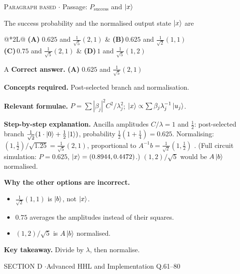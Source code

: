 \documentclass[11pt,a4paper]{article}
\newcommand{\optlabel}[1]{\textbf{(#1)}}
\newcommand{\correctlabel}[1]{\textcolor{okgreen}{\textbf{(#1)}\,\ding{51}}}
\newenvironment{qitem}[1]{\begin{list}{}{\setlength{\leftmargin}{3.3em}\setlength{\labelwidth}{3.1em}%
  \setlength{\labelsep}{0.2em}\setlength{\topsep}{3pt}\setlength{\parsep}{3pt}}\item[\textbf{Q.#1}\hfill]}{\end{list}}
\newcommand{\qsep}{\par\vspace{2pt}{\color{black!15}\hrule}\vspace{4pt}}
\newcommand{\qmeta}[2]{{\footnotesize\color{black!60}\textsc{#1} \;$\cdot$\; #2}\par}
\begin{document}
\begin{qitem}{60}
\qmeta{Paragraph based}{Passage: $P_{\text{success}}$ and $\ket x$}
The success probability and the normalised output state $\ket x$ are
\par\smallskip\noindent\begin{tabularx}{\linewidth}{@{}*{2}{L}@{}}
\correctlabel{A}\,$0.625$ and $\tfrac{1}{\sqrt5}(2, 1)$ & \optlabel{B}\,$0.625$ and $\tfrac{1}{\sqrt2}(1, 1)$ \\[3pt]
\optlabel{C}\,$0.75$ and $\tfrac{1}{\sqrt5}(2, 1)$ & \optlabel{D}\,$1$ and $\tfrac{1}{\sqrt5}(1, 2)$
\end{tabularx}
\end{qitem}
\begin{solbox}{A}
\textbf{\color{brand}Correct answer.} \textcolor{okgreen}{\textbf{(A)}} $0.625$ and $\tfrac{1}{\sqrt5}(2, 1)$

\textbf{\color{brand}Concepts required.} Post-selected branch and normalisation.

\textbf{\color{brand}Relevant formulae.} $P = \sum|\beta_j|^2C^2/\lambda_j^2$; $\ket x \propto \sum\beta_j\lambda_j^{-1}\ket{u_j}$.

\textbf{\color{brand}Step-by-step explanation.} Ancilla amplitudes $C/\lambda = 1$ and $\tfrac12$: post-selected branch $\tfrac{1}{\sqrt2}(1\cdot\ket0 + \tfrac12\ket1)$, probability $\tfrac12(1 + \tfrac14) = 0.625$. Normalising: $(1, \tfrac12)/\sqrt{1.25} = \tfrac{1}{\sqrt5}(2, 1)$,
proportional to $A^{-1}b = \tfrac{1}{\sqrt2}(1, \tfrac12)$ \checkmark. (Full circuit simulation: $P = 0.625$, $\ket x = (0.8944, 0.4472)$.) $(1, 2)/\sqrt5$ would be $A\ket b$ normalised.

\textbf{\color{brand}Why the other options are incorrect.}
\begin{itemize}[leftmargin=2.4em, itemsep=1pt, topsep=2pt]
\item[\textbf{(B)}] $\frac{1}{\sqrt2}(1, 1)$ is $\ket b$, not $\ket x$.
\item[\textbf{(C)}] $0.75$ averages the amplitudes instead of their squares.
\item[\textbf{(D)}] $(1, 2)/\sqrt5$ is $A\ket b$ normalised.
\end{itemize}
\textbf{\color{brand}Key takeaway.} Divide by $\lambda$, then normalise.
\end{solbox}
\qsep

\newpage

\begin{sectionbanner}SECTION D \enspace$\cdot$\enspace Advanced HHL and Implementation \hfill Q.61--80\end{sectionbanner}
\end{document}
